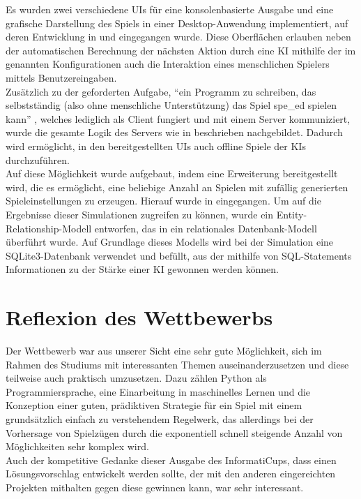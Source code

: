 Es wurden zwei verschiedene \ac{UI}s für eine konsolenbasierte Ausgabe und eine grafische Darstellung des Spiels in
einer Desktop-Anwendung implementiert, auf deren Entwicklung in  und
 eingegangen wurde.
Diese Oberflächen erlauben neben der automatischen Berechnung der nächsten Aktion durch eine \ac{KI} mithilfe der im
 genannten Konfigurationen auch die Interaktion eines menschlichen Spielers mittels
Benutzereingaben. \\

Zusätzlich zu der geforderten Aufgabe, "`ein Programm zu schreiben, das selbstständig (also ohne menschliche
Unterstützung) das Spiel spe\_ed spielen kann"' , welches lediglich als Client fungiert und
mit einem Server kommuniziert, wurde die gesamte Logik des Servers wie in 
beschrieben nachgebildet.
Dadurch wird ermöglicht, in den bereitgestellten \ac{UI}s auch offline Spiele der \ac{KI}s durchzuführen. \\

Auf diese Möglichkeit wurde aufgebaut, indem eine Erweiterung bereitgestellt wird, die es ermöglicht, eine beliebige
Anzahl an Spielen mit zufällig generierten Spieleinstellungen zu erzeugen.
Hierauf wurde in  eingegangen.
Um auf die Ergebnisse dieser Simulationen zugreifen zu können, wurde ein Entity-Relationship-Modell entworfen, das in
ein relationales Datenbank-Modell überführt wurde.
Auf Grundlage dieses Modells wird bei der Simulation eine SQLite3-Datenbank verwendet und befüllt, aus der mithilfe von
SQL-Statements Informationen zu der Stärke einer \ac{KI} gewonnen werden können. \\

\section{Reflexion des Wettbewerbs}
\label{sec:reflexion}

Der Wettbewerb war aus unserer Sicht eine sehr gute Möglichkeit, sich im Rahmen des Studiums mit interessanten Themen
auseinanderzusetzen und diese teilweise auch praktisch umzusetzen.
Dazu zählen \ua Python als Programmiersprache, eine Einarbeitung in maschinelles Lernen und die Konzeption einer
guten, prädiktiven Strategie für ein Spiel mit einem grundsätzlich einfach zu verstehendem Regelwerk, das allerdings
bei der Vorhersage von Spielzügen durch die exponentiell schnell steigende Anzahl von Möglichkeiten sehr komplex wird.
\\

Auch der kompetitive Gedanke dieser Ausgabe des InformatiCups, dass einen Lösungsvorschlag entwickelt werden sollte,
der mit den anderen eingereichten Projekten mithalten \bzw gegen diese gewinnen kann, war sehr interessant.
